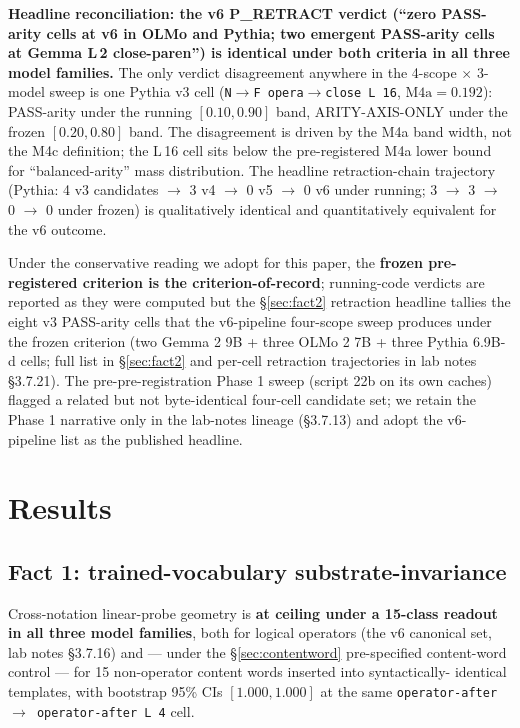 \documentclass[11pt,letterpaper]{article}
\newcommand{\Mbfc}{M4c}
\begin{document}
\textbf{Headline reconciliation: the v6 P\_RETRACT verdict (``zero
PASS-arity cells at v6 in OLMo and Pythia; two emergent PASS-arity
cells at Gemma L\,2 close-paren'') is identical under both criteria
in all three model families.} The only verdict disagreement anywhere
in the 4-scope $\times$ 3-model sweep is one Pythia v3 cell
(\texttt{N$\to$F opera$\to$close L\,16}, $\text{M4a}=0.192$):
PASS-arity under the running $[0.10, 0.90]$ band, ARITY-AXIS-ONLY
under the frozen $[0.20, 0.80]$ band. The disagreement is driven by
the M4a band width, not the \Mbfc{} definition; the L\,16 cell sits
below the pre-registered M4a lower bound for ``balanced-arity'' mass
distribution. The headline retraction-chain trajectory (Pythia: 4
v3 candidates $\to$ 3 v4 $\to$ 0 v5 $\to$ 0 v6 under running; 3
$\to$ 3 $\to$ 0 $\to$ 0 under frozen) is qualitatively identical and
quantitatively equivalent for the v6 outcome.

Under the conservative reading we
adopt for this paper, the \textbf{frozen pre-registered criterion is
the criterion-of-record}; running-code verdicts are reported as they
were computed but the \S\ref{sec:fact2} retraction headline tallies
the eight v3 PASS-arity cells that the v6-pipeline four-scope sweep
produces under the frozen criterion (two Gemma 2 9B + three OLMo 2
7B + three Pythia 6.9B-d cells; full list in \S\ref{sec:fact2} and
per-cell retraction trajectories in lab notes \S3.7.21). The
pre-pre-registration Phase 1 sweep (script 22b on its own caches)
flagged a related but not byte-identical four-cell candidate set;
we retain the Phase 1 narrative only in the lab-notes lineage
(\S3.7.13) and adopt the v6-pipeline list as the published headline.

\section{Results}
\label{sec:results}

\subsection{Fact 1: trained-vocabulary substrate-invariance}
\label{sec:fact1}

Cross-notation linear-probe geometry is \textbf{at ceiling under a
15-class readout in all three model families}, both for logical
operators (the v6 canonical set, lab notes \S3.7.16) and --- under
the \S\ref{sec:contentword} pre-specified content-word control ---
for 15 non-operator content words inserted into syntactically-
identical templates, with bootstrap 95\% CIs $[1.000, 1.000]$ at the
same \texttt{operator-after $\to$ operator-after L\,4} cell.
\end{document}
